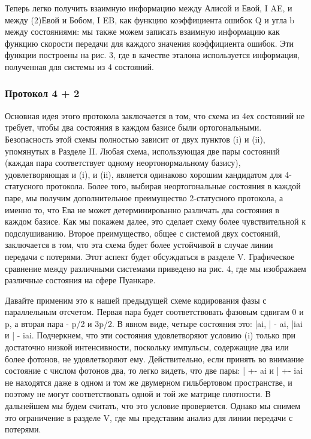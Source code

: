 Теперь легко получить взаимную информацию между Алисой и Евой, I AE, и между (2)Евой и Бобом, I EB, как функцию коэффициента ошибок Q и угла b между состояниями: мы также можем записать взаимную информацию как функцию скорости передачи для каждого значения коэффициента ошибок. Эти функции построены на рис. 3, где в качестве эталона используется информация, полученная для системы из 4 состояний.

\subsubsection{Протокол 4 + 2}

Основная идея этого протокола заключается в том, что схема из 4ех состояний не требует, чтобы два состояния в каждом базисе были ортогональными. Безопасность этой схемы полностью зависит от двух пунктов (i) и (ii), упомянутых в Разделе II. Любая схема, использующая две пары состояний (каждая пара соответствует одному неортонормальному базису), удовлетворяющая и (i), и (ii), является одинаково хорошим кандидатом для 4-статусного протокола. Более того, выбирая неортогональные состояния в каждой паре, мы получим дополнительное преимущество 2-статусного протокола, а именно то, что Ева не может детерминированно различать два состояния в каждом базисе. Как мы покажем далее, это сделает схему более чувствительной к подслушиванию. Второе преимущество, общее с системой двух состояний, заключается в том, что эта схема будет более устойчивой в случае линии передачи с потерями. Этот аспект будет обсуждаться в разделе V. Графическое сравнение между различными системами приведено на рис. 4, где мы изображаем различные состояния на сфере Пуанкаре.

Давайте применим это к нашей предыдущей схеме кодирования фазы с параллельным отсчетом. Первая пара будет соответствовать фазовым сдвигам 0 и p, а вторая пара - p/2 и 3p/2. В явном виде, четыре состояния это: |ai, | - ai, |iai и | - iai. Подчеркнем, что эти состояния удовлетворяют условию (i) только при достаточно низкой интенсивности, поскольку импульсы, содержащие два или более фотонов, не удовлетворяют ему. Действительно, если принять во внимание состояние с числом фотонов два, то легко видеть, что две пары: | +- ai и | +- iai не находятся даже в одном и том же двумерном гильбертовом пространстве, и поэтому не могут соответствовать одной и той же матрице плотности. В дальнейшем мы будем считать, что это условие проверяется. Однако мы снимем это ограничение в разделе V, где мы представим анализ для линии передачи с потерями.

